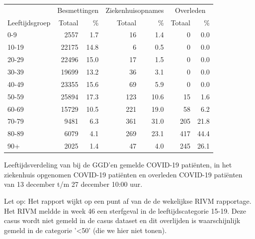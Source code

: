 \documentclass[
  english,
  man,floatsintext]{apa6}
\begin{document}
\begin{table}[H]
\centering\begingroup\fontsize{11}{13}\selectfont

\begin{threeparttable}
\begin{tabular}{lrrrrrr}
\toprule
\multicolumn{1}{c}{ } & \multicolumn{2}{c}{Besmettingen} & \multicolumn{2}{c}{Ziekenhuisopnames} & \multicolumn{2}{c}{Overleden} \\
\cmidrule(l{3pt}r{3pt}){2-3} \cmidrule(l{3pt}r{3pt}){4-5} \cmidrule(l{3pt}r{3pt}){6-7}
Leeftijdsgroep & Totaal & \% & Totaal & \% & Totaal & \%\\
\midrule
0-9 & 2557 & 1.7 & 16 & 1.4 & 0 & 0.0\\
10-19 & 22175 & 14.8 & 6 & 0.5 & 0 & 0.0\\
20-29 & 22496 & 15.0 & 17 & 1.5 & 0 & 0.0\\
30-39 & 19699 & 13.2 & 36 & 3.1 & 0 & 0.0\\
40-49 & 23355 & 15.6 & 69 & 5.9 & 0 & 0.0\\
50-59 & 25894 & 17.3 & 123 & 10.6 & 15 & 1.6\\
60-69 & 15729 & 10.5 & 221 & 19.0 & 58 & 6.2\\
70-79 & 9481 & 6.3 & 361 & 31.0 & 205 & 21.8\\
80-89 & 6079 & 4.1 & 269 & 23.1 & 417 & 44.4\\
90+ & 2025 & 1.4 & 47 & 4.0 & 245 & 26.1\\
\bottomrule
\end{tabular}
\begin{tablenotes}
\item[1] Leeftijdsverdeling van bij de GGD’en gemelde COVID-19 patiënten, in het ziekenhuis opgenomen COVID-19 patiënten en overleden COVID-19 patiënten van 13 december t/m 27 december 10:00 uur.
\item[2] Let op: Het rapport wijkt op een punt af van de de wekelijkse RIVM rapportage. Het RIVM meldde in week 46 een sterfgeval in de leeftijdscategorie 15-19. Deze casus wordt niet gemeld in de casus dataset en dit overlijden is waarschijnlijk gemeld in de categorie '<50' (die we hier niet tonen).
\end{tablenotes}
\end{threeparttable}
\endgroup{}
\end{table}

\newpage
\end{document}
